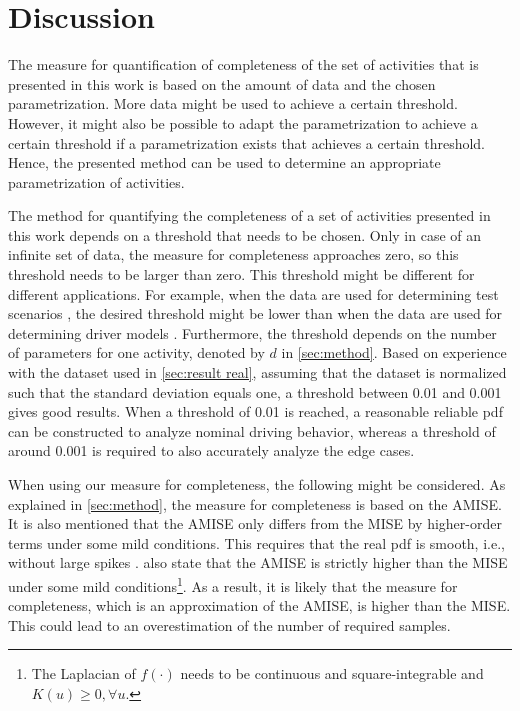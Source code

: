 \section{Discussion}
\label{sec:discussion}

The measure for quantification of completeness of the set of activities that is presented in this work is based on the amount of data and the chosen parametrization. More data might be used to achieve a certain threshold. However, it might also be possible to adapt the parametrization to achieve a certain threshold if a parametrization exists that achieves a certain threshold. Hence, the presented method can be used to determine an appropriate parametrization of activities.

The method for quantifying the completeness of a set of activities presented in this work depends on a threshold that needs to be chosen. Only in case of an infinite set of data, the measure for completeness approaches zero, so this threshold needs to be larger than zero. This threshold might be different for different applications. For example, when the data are used for determining test scenarios \cite{elrofai2018scenario, ploeg2018cetran}, the desired threshold might be lower than when the data are used for determining driver models \cite{wang2017much, sadigh2014data}. 
Furthermore, the threshold depends on the number of parameters for one activity, denoted by $d$ in \cref{sec:method}. Based on experience with the dataset used in \cref{sec:result real}, assuming that the dataset is normalized such that the standard deviation equals one, a threshold between 0.01 and 0.001 gives good results. When a threshold of 0.01 is reached, a reasonable reliable pdf can be constructed to analyze nominal driving behavior, whereas a threshold of around 0.001 is required to also accurately analyze the edge cases. 

When using our measure for completeness, the following might be considered. As explained in \cref{sec:method}, the measure for completeness is based on the AMISE. It is also mentioned that the AMISE only differs from the MISE by higher-order terms under some mild conditions. This requires that the real pdf is smooth, i.e., without large spikes \cite{marron1992exact}. \textcite{marron1992exact} also state that the AMISE is strictly higher than the MISE under some mild conditions\footnote{The Laplacian of $f(\cdot)$ needs to be continuous and square-integrable and $K(u) \geq 0, \forall u$.}. As a result, it is likely that the measure for completeness, which is an approximation of the AMISE, is higher than the MISE. This could lead to an overestimation of the number of required samples.

